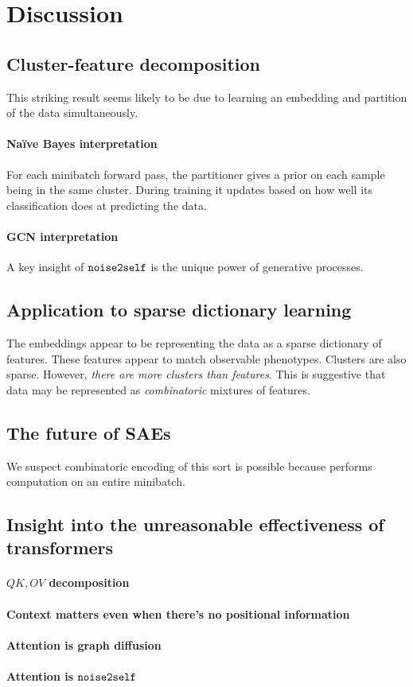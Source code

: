 \section{Discussion}

\subsection{Cluster-feature decomposition}
This striking result seems likely to be due to learning an embedding and partition of the data simultaneously.

\paragraph{Na\"ive Bayes interpretation}
For each minibatch forward pass, the partitioner gives a prior on each sample being in the same cluster.
During training it updates based on how well its classification does at predicting the data.

\paragraph{GCN interpretation}
A key insight of $\mathop{\mathtt{noise2self}}\limits$ is the unique power of generative processes.



\subsection{Application to sparse dictionary learning}

The embeddings appear to be representing the data as a sparse dictionary of features.
These features appear to match observable phenotypes.
Clusters are also sparse. However, \textit{there are more clusters than features}.
This is suggestive that data may be represented as \textit{combinatoric} mixtures of features. 

\subsection{The future of SAEs}

We suspect combinatoric encoding of this sort is possible because \DeePWAK performs computation on an entire minibatch.

\subsection{Insight into the unreasonable effectiveness of transformers}
\paragraph{$QK,OV$ decomposition}
\paragraph{Context matters even when there's no positional information}
\paragraph{Attention is graph diffusion}
\paragraph{Attention is $\mathop{\mathtt{noise2self}}\limits$}

